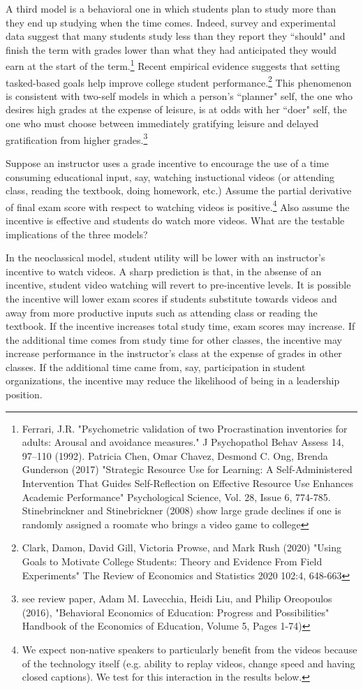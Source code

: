 \documentclass[12pt]{article}
\begin{document}
A third model is a behavioral one in which students plan to study more than they end up studying when the time comes. Indeed, survey and experimental data suggest that many students study less than they report they ``should" and finish the term with grades lower than what they had anticipated they would earn at the start of the term.\footnote{Ferrari, J.R. "Psychometric validation of two Procrastination inventories for adults: Arousal and avoidance measures." J Psychopathol Behav Assess 14, 97–110 (1992). Patricia Chen, Omar Chavez, Desmond C. Ong, Brenda Gunderson (2017) "Strategic Resource Use for Learning: A Self-Administered Intervention That Guides Self-Reflection on Effective Resource Use Enhances Academic Performance" Psychological Science, Vol. 28, Issue 6, 774-785.  Stinebrinckner and Stinebrickner (2008) show large grade declines if one is randomly assigned a roomate who brings a video game to college} Recent empirical evidence suggests that setting tasked-based goals help improve college student performance.\footnote{Clark, Damon, David Gill, Victoria Prowse, and Mark Rush (2020) "Using Goals to Motivate College Students: Theory and Evidence From Field Experiments" The Review of Economics and Statistics 2020 102:4, 648-663} This phenomenon is consistent with two-self models in which a person's ``planner" self, the one who desires high grades at the expense of leisure, is at odds with her ``doer" self, the one who must choose between immediately gratifying leisure and delayed gratification from higher grades.\footnote{see review paper, Adam M. Lavecchia, Heidi Liu, and Philip Oreopoulos (2016), "Behavioral Economics of Education: Progress and Possibilities"  Handbook of the Economics of Education, Volume 5, Pages 1-74)} 

Suppose an instructor uses a grade incentive to encourage the use of a time consuming educational input, say, watching instuctional videos (or attending class, reading the textbook, doing homework, etc.) Assume the partial derivative of final exam score with respect to watching videos is positive.\footnote{We expect non-native speakers to particularly benefit from the videos because of the technology itself (e.g. ability to replay videos, change speed and having closed captions). We test for this interaction in the results below.} Also assume the incentive is effective and students do watch more videos.  What are the testable implications of the three models? 

In the neoclassical model, student utility will be lower with an instructor's incentive to watch videos.  A sharp prediction is that, in the absense of an incentive, student video watching will revert to pre-incentive levels.  It is possible the incentive will lower exam scores if students substitute towards videos and away from more productive inputs such as attending class or reading the textbook.  If the incentive increases total study time, exam scores may increase.  If the additional time comes from study time for other classes, the incentive may increase performance in the instructor's class at the expense of grades in other classes. If the additional time came from, say, participation in student organizations, the incentive may reduce the likelihood of being in a leadership position. 
\end{document}

